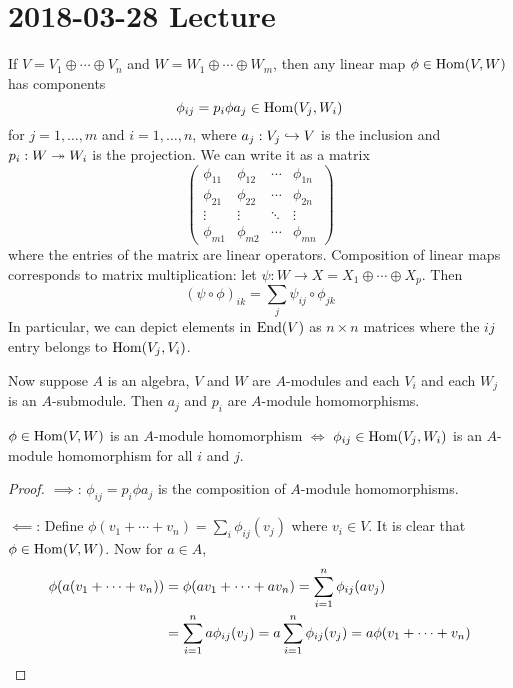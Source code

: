 \section{2018-03-28 Lecture}

\begin{prop}
	If $V = V_1 \oplus \cdots \oplus V_n$ and $W = W_1 \oplus \cdots \oplus W_m$, then any linear map $\phi \in \operatorname{Hom}(V,W)$ has components
    \[\phi_{ij} = p_i \phi a_j \in \operatorname{Hom}(V_j,W_i)\]
    for $j=1,\ldots,m$ and $i=1,\ldots,n$, where $a_j: V_j \hookrightarrow V$ is the inclusion and $p_i: W \twoheadrightarrow W_i$ is the projection.
    We can write it as a matrix
    \[
    \begin{pmatrix}
    	\phi_{11} & \phi_{12} & \cdots & \phi_{1n} \\
        \phi_{21} & \phi_{22} & \cdots & \phi_{2n} \\
        \vdots & \vdots & \ddots & \vdots \\
        \phi_{m1} & \phi_{m2} & \cdots & \phi_{mn}
    \end{pmatrix}
    \]
    where the entries of the matrix are linear operators.
    Composition of linear maps corresponds to matrix multiplication: let $\psi: W \to X = X_1 \oplus \cdots \oplus X_p$.
    Then
    \[(\psi\circ\phi)_{ik} = \sum_j \psi_{ij} \circ \phi_{jk}\]
    In particular, we can depict elements in $\operatorname{End}(V)$ as $n \times n$ matrices where the $ij$ entry belongs to $\operatorname{Hom}(V_j,V_i)$.
    
	Now suppose $A$ is an algebra, $V$ and $W$ are $A$-modules and each $V_i$ and each $W_j$ is an $A$-submodule.
    Then $a_j$ and $p_i$ are $A$-module homomorphisms.
\end{prop}

\begin{prop}
	$\phi \in \operatorname{Hom}(V,W)$ is an $A$-module homomorphism $\iff$ $\phi_{ij} \in \operatorname{Hom}(V_j,W_i)$ is an $A$-module homomorphism for all $i$ and $j$.
\end{prop}

\begin{proof}
	$\implies$: $\phi_{ij} = p_i \phi a_j$ is the composition of $A$-module homomorphisms.
    
    $\impliedby$: Define $\phi(v_1+\cdots+v_n) = \sum_i \phi_{ij}(v_j)$ where $v_i \in V$.
    It is clear that $\phi \in \operatorname{Hom}(V,W)$.
    Now for $a \in A$,
    \begin{align*}
    	\phi(a(v_1+\cdots+v_n)) &= \phi(av_1+\cdots+av_n) = \sum_{i=1}^n \phi_{ij}(av_j) \\
    	&= \sum_{i=1}^n a \phi_{ij}(v_j) = a \sum_{i=1}^n \phi_{ij}(v_j) = a\phi(v_1+\cdots+v_n) \qedhere
    \end{align*}
\end{proof}

